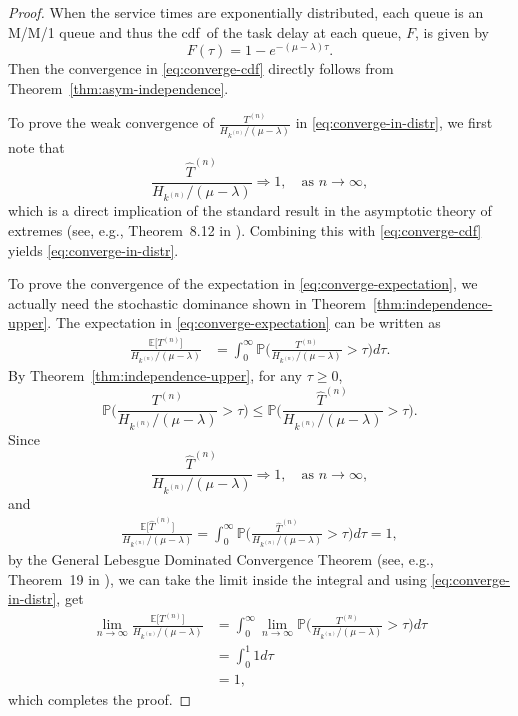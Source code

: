 \documentclass[sigconf]{acmart}
\renewcommand{\Pr}{\mathbb{P}} %
\newcommand{\expect}{\mathbb{E}} %
\newcommand{\cdf}{cdf}
\newcommand{\supn}{^{(n)}}
\newcommand{\tod}{\Rightarrow}
\begin{document}
\begin{proof}
When the service times are exponentially distributed, each queue is an M/M/1 queue and thus the \cdf\ of the task delay at each queue, $F$, is given by
\begin{equation*}
F(\tau)=1-e^{-(\mu-\lambda)\tau}.
\end{equation*}
Then the convergence in \eqref{eq:converge-cdf} directly follows from Theorem~\ref{thm:asym-independence}.

To prove the weak convergence of $\frac{T\supn}{H_{k\supn}/(\mu-\lambda)}$ in \eqref{eq:converge-in-distr}, we first note that
\begin{equation*}
\frac{\hat{T}\supn}{H_{k\supn}/(\mu-\lambda)}\tod 1,\quad\text{as }n\to\infty,
\end{equation*}
which is a direct implication of the standard result in the asymptotic theory of extremes (see, e.g., Theorem~8.12 in \cite{Das_08}).
Combining this with \eqref{eq:converge-cdf} yields \eqref{eq:converge-in-distr}.

To prove the convergence of the expectation in \eqref{eq:converge-expectation}, we actually need the stochastic dominance shown in Theorem~\ref{thm:independence-upper}. The expectation in \eqref{eq:converge-expectation} can be written as
\begin{align*}
\frac{\expect\bigl[T\supn\bigr]}{H_{k\supn}/(\mu-\lambda)}&=\int_{0}^{\infty}\Pr\biggl(\frac{T\supn}{H_{k\supn}/(\mu-\lambda)}> \tau\biggr)d\tau.
\end{align*}
By Theorem~\ref{thm:independence-upper}, for any $\tau\ge 0$,
\begin{equation*}
\Pr\biggl(\frac{T\supn}{H_{k\supn}/(\mu-\lambda)}> \tau\biggr)\le \Pr\biggl(\frac{\hat{T}\supn}{H_{k\supn}/(\mu-\lambda)}> \tau\biggr).
\end{equation*}
Since
\begin{equation*}
\frac{\hat{T}\supn}{H_{k\supn}/(\mu-\lambda)}\tod 1,\quad\text{as }n\to\infty,
\end{equation*}
and
\begin{align*}
\frac{\expect\bigl[\hat{T}\supn\bigr]}{H_{k\supn}/(\mu-\lambda)}=\int_{0}^{\infty}\Pr\biggl(\frac{\hat{T}\supn}{H_{k\supn}/(\mu-\lambda)}> \tau\biggr)d\tau=1,
\end{align*}
by the General Lebesgue Dominated Convergence Theorem (see, e.g., Theorem~19 in \cite{RoyFit_10}), we can take the limit inside the integral and using \eqref{eq:converge-in-distr}, get
\begin{align*}
\lim_{n\to\infty} \frac{\expect\bigl[T\supn\bigr]}{H_{k\supn}/(\mu-\lambda)}&=\int_{0}^{\infty}\lim_{n\to\infty}\Pr\biggl(\frac{T\supn}{H_{k\supn}/(\mu-\lambda)}> \tau\biggr)d\tau\\
&=\int_{0}^1 1 d\tau\\
&=1,
\end{align*}
which completes the proof.
\end{proof}
\end{document}
